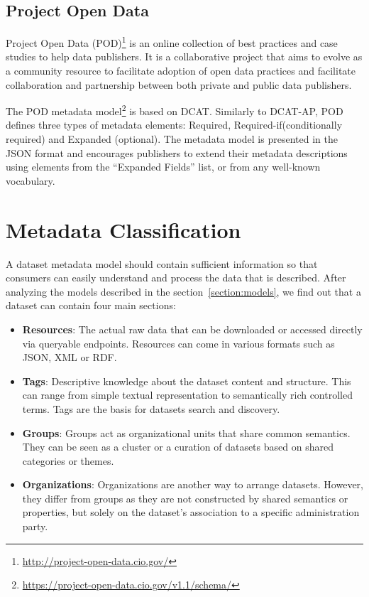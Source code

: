 \subsection{Project Open Data}
Project Open Data (POD)\footnote{\url{http://project-open-data.cio.gov/}} is an online collection of best practices and case studies to help data publishers. It is a collaborative project that aims to evolve as a community resource to facilitate adoption of open data practices and facilitate collaboration and partnership between both private and public data publishers.

The POD metadata model\footnote{\url{https://project-open-data.cio.gov/v1.1/schema/}} is based on DCAT. Similarly to DCAT-AP, POD defines three types of metadata elements: Required, Required-if(conditionally required) and Expanded (optional). The metadata model is presented in the JSON format and encourages publishers to extend their metadata descriptions using elements from the ``Expanded Fields'' list, or from any well-known vocabulary.


\section{Metadata Classification}
\label{section:metadata}
A dataset metadata model should contain sufficient information so that consumers can easily understand and process the data that is described. After analyzing the models described in the section~\ref{section:models}, we find out that a dataset can contain four main sections:
\begin{itemize}
  \item \textbf{Resources}: The actual raw data that can be downloaded or accessed directly via queryable endpoints. Resources can come in various formats such as JSON, XML or RDF.
  \item \textbf{Tags}: Descriptive knowledge about the dataset content and structure. This can range from simple textual representation to semantically rich controlled terms. Tags are the basis for datasets search and discovery.
  \item \textbf{Groups}: Groups act as organizational units that share common semantics. They can be seen as a cluster or a curation of datasets based on shared categories or themes.
  \item \textbf{Organizations}: Organizations are another way to arrange datasets. However, they differ from groups as they are not constructed by shared semantics or properties, but solely on the dataset's association to a specific administration party.
\end{itemize}

